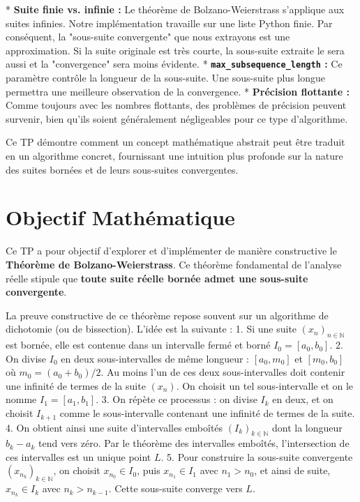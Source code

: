 \documentclass{report}
\begin{document}
*   \textbf{Suite finie vs. infinie :} Le théorème de Bolzano-Weierstrass s'applique aux suites infinies. Notre implémentation travaille sur une liste Python finie. Par conséquent, la "sous-suite convergente" que nous extrayons est une approximation. Si la suite originale est très courte, la sous-suite extraite le sera aussi et la "convergence" sera moins évidente.
*   \textbf{\texttt{max\_subsequence\_length} :} Ce paramètre contrôle la longueur de la sous-suite. Une sous-suite plus longue permettra une meilleure observation de la convergence.
*   \textbf{Précision flottante :} Comme toujours avec les nombres flottants, des problèmes de précision peuvent survenir, bien qu'ils soient généralement négligeables pour ce type d'algorithme.

Ce TP démontre comment un concept mathématique abstrait peut être traduit en un algorithme concret, fournissant une intuition plus profonde sur la nature des suites bornées et de leurs sous-suites convergentes.

\newpage


\section*{Objectif Mathématique}

Ce TP a pour objectif d'explorer et d'implémenter de manière constructive le \textbf{Théorème de Bolzano-Weierstrass}. Ce théorème fondamental de l'analyse réelle stipule que \textbf{toute suite réelle bornée admet une sous-suite convergente}.

La preuve constructive de ce théorème repose souvent sur un algorithme de dichotomie (ou de bissection). L'idée est la suivante :
1.  Si une suite $(x_n)_{n \in \mathbb{N}}$ est bornée, elle est contenue dans un intervalle fermé et borné $I_0 = [a_0, b_0]$.
2.  On divise $I_0$ en deux sous-intervalles de même longueur : $[a_0, m_0]$ et $[m_0, b_0]$ où $m_0 = (a_0+b_0)/2$. Au moins l'un de ces deux sous-intervalles doit contenir une infinité de termes de la suite $(x_n)$. On choisit un tel sous-intervalle et on le nomme $I_1 = [a_1, b_1]$.
3.  On répète ce processus : on divise $I_k$ en deux, et on choisit $I_{k+1}$ comme le sous-intervalle contenant une infinité de termes de la suite.
4.  On obtient ainsi une suite d'intervalles emboîtés $(I_k)_{k \in \mathbb{N}}$ dont la longueur $b_k - a_k$ tend vers zéro. Par le théorème des intervalles emboîtés, l'intersection de ces intervalles est un unique point $L$.
5.  Pour construire la sous-suite convergente $(x_{n_k})_{k \in \mathbb{N}}$, on choisit $x_{n_0} \in I_0$, puis $x_{n_1} \in I_1$ avec $n_1 > n_0$, et ainsi de suite, $x_{n_k} \in I_k$ avec $n_k > n_{k-1}$. Cette sous-suite converge vers $L$.
\end{document}
